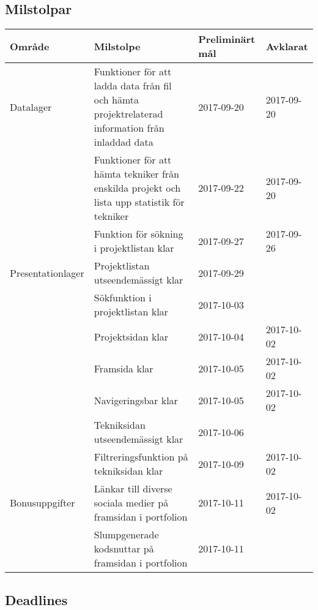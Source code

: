 \documentclass{TDP003mall}
\begin{document}
\subsection{Milstolpar}

\begin{table}[!h]
\renewcommand{\arraystretch}{1.5}
\begin{tabularx}{\linewidth}{|l|X|l|l|}
\hline
\textbf{Område} & \textbf{Milstolpe} & \textbf{Preliminärt mål} & \textbf{Avklarat}\\
\hline
Datalager & Funktioner för att ladda data från fil och hämta projektrelaterad information från inladdad data & 2017-09-20 & 2017-09-20\\
\cline{2-4}
& Funktioner för att hämta tekniker från enskilda projekt och lista upp statistik för tekniker & 2017-09-22 & 2017-09-20\\
\cline{2-4}
& Funktion för sökning i projektlistan klar & 2017-09-27 & 2017-09-26\\
\hline
Presentationlager & Projektlistan utseendemässigt klar & 2017-09-29 &\\
\cline{2-4}
& Sökfunktion i projektlistan klar & 2017-10-03 &\\
\cline{2-4}
& Projektsidan klar & 2017-10-04&2017-10-02\\
\cline{2-4}
& Framsida klar & 2017-10-05 & 2017-10-02\\
\cline{2-4}
& Navigeringsbar klar & 2017-10-05 & 2017-10-02\\
\cline{2-4}
& Tekniksidan utseendemässigt klar & 2017-10-06  &\\
\cline{2-4}
& Filtreringsfunktion på tekniksidan klar & 2017-10-09 & 2017-10-02\\
\hline
Bonusuppgifter & Länkar till diverse sociala medier på framsidan i portfolion & 2017-10-11 & 2017-10-02\\
\cline{2-4}
& Slumpgenerade kodsnuttar på framsidan i portfolion & 2017-10-11 &\\
\hline
\end{tabularx}
\end{table}

\subsection{Deadlines}
\end{document}
